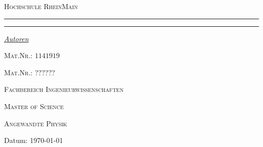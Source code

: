 \begin{titlepage}
	\newcommand{\HRule}{\rule{\linewidth}{0.5mm}}
	\centering
	\textsc{\Large Hochschule RheinMain} \par

	\begin{center}
		
	\end{center}
	\textsc{\LARGE \titleLV}\vspace{0.5cm}
	\HRule\vspace{0.6cm}
	{\huge\bfseries \subtitleA}\par\vspace{0.4cm} %
	{\huge\bfseries \subtitleB}\par\vspace{0.4cm}
	\HRule\vspace{1.5cm}
	\begin{minipage}{0.4\textwidth}
		\centering
		\Large
		\textit{\underline{Autoren}}\par\vspace{0.5cm}
		\textsc{\nameA}\par\vspace{0.25cm}
		\large
		\textsc{Mat.Nr.: \(1141919\)}\par\vspace{.5cm}
		\Large
		\textsc{\nameB}\par\vspace{0.25cm}
		\large
		\textsc{Mat.Nr.: \(??????\)}\par\vspace{2cm}
	\end{minipage}
	\vfill\vfill\vfill
	\textsc{\Large Fachbereich Ingenieurwissenschaften}\par\vspace{0.5cm}\par
	\textsc{\large Master of Science}\par\vspace{0.5cm}
	\textsc{\large Angewandte Physik}\par\vspace{0.2cm}
	\vfill
	\begin{flushleft}
		Datum:\hspace{0.4cm} {\large\today}
	\end{flushleft}
\end{titlepage}
